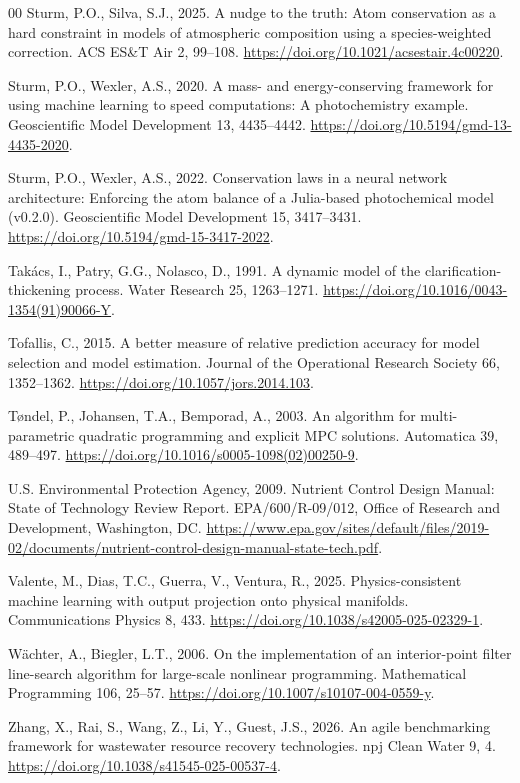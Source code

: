 \documentclass[a4paper,fleqn]{cas-sc}
\begin{document}
\begin{thebibliography}{00}
Sturm, P.O., Silva, S.J., 2025. A nudge to the truth: Atom conservation as a hard constraint in models of atmospheric composition using a species-weighted correction. ACS ES\&T Air 2, 99--108. \url{https://doi.org/10.1021/acsestair.4c00220}.

Sturm, P.O., Wexler, A.S., 2020. A mass- and energy-conserving framework for using machine learning to speed computations: A photochemistry example. Geoscientific Model Development 13, 4435--4442. \url{https://doi.org/10.5194/gmd-13-4435-2020}.

Sturm, P.O., Wexler, A.S., 2022. Conservation laws in a neural network architecture: Enforcing the atom balance of a Julia-based photochemical model (v0.2.0). Geoscientific Model Development 15, 3417--3431. \url{https://doi.org/10.5194/gmd-15-3417-2022}.

Tak\'acs, I., Patry, G.G., Nolasco, D., 1991. A dynamic model of the clarification-thickening process. Water Research 25, 1263--1271. \url{https://doi.org/10.1016/0043-1354(91)90066-Y}.

Tofallis, C., 2015. A better measure of relative prediction accuracy for model selection and model estimation. Journal of the Operational Research Society 66, 1352--1362. \url{https://doi.org/10.1057/jors.2014.103}.

T{\o}ndel, P., Johansen, T.A., Bemporad, A., 2003. An algorithm for multi-parametric quadratic programming and explicit MPC solutions. Automatica 39, 489--497. \url{https://doi.org/10.1016/s0005-1098(02)00250-9}.

U.S. Environmental Protection Agency, 2009. Nutrient Control Design Manual: State of Technology Review Report. EPA/600/R-09/012, Office of Research and Development, Washington, DC. \url{https://www.epa.gov/sites/default/files/2019-02/documents/nutrient-control-design-manual-state-tech.pdf}.

Valente, M., Dias, T.C., Guerra, V., Ventura, R., 2025. Physics-consistent machine learning with output projection onto physical manifolds. Communications Physics 8, 433. \url{https://doi.org/10.1038/s42005-025-02329-1}.

W\"achter, A., Biegler, L.T., 2006. On the implementation of an interior-point filter line-search algorithm for large-scale nonlinear programming. Mathematical Programming 106, 25--57. \url{https://doi.org/10.1007/s10107-004-0559-y}.

Zhang, X., Rai, S., Wang, Z., Li, Y., Guest, J.S., 2026. An agile benchmarking framework for wastewater resource recovery technologies. npj Clean Water 9, 4. \url{https://doi.org/10.1038/s41545-025-00537-4}.
\end{thebibliography}
\end{document}
